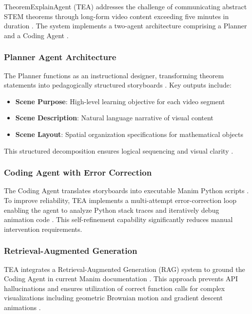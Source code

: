\documentclass[11pt,a4paper]{article}
\begin{document}
TheoremExplainAgent (TEA) addresses the challenge of communicating abstract STEM theorems through long-form video content exceeding five minutes in duration \cite{teaproject2024, researchgate2024tea}. The system implements a two-agent architecture comprising a Planner and a Coding Agent \cite{teaproject2024, researchgate2024tea}.

\subsubsection{Planner Agent Architecture}

The Planner functions as an instructional designer, transforming theorem statements into pedagogically structured storyboards \cite{arxivpdf2024tea}. Key outputs include:

\begin{itemize}
\item \textbf{Scene Purpose}: High-level learning objective for each video segment
\item \textbf{Scene Description}: Natural language narrative of visual content
\item \textbf{Scene Layout}: Spatial organization specifications for mathematical objects
\end{itemize}

This structured decomposition ensures logical sequencing and visual clarity \cite{arxiv2024visualstory}.

\subsubsection{Coding Agent with Error Correction}

The Coding Agent translates storyboards into executable Manim Python scripts \cite{teaproject2024, arxivpdf2024tea}. To improve reliability, TEA implements a multi-attempt error-correction loop enabling the agent to analyze Python stack traces and iteratively debug animation code \cite{arxivpdf2024tea}. This self-refinement capability significantly reduces manual intervention requirements.

\subsubsection{Retrieval-Augmented Generation}

TEA integrates a Retrieval-Augmented Generation (RAG) system to ground the Coding Agent in current Manim documentation \cite{github2024tea, arxivpdf2024tea}. This approach prevents API hallucinations and ensures utilization of correct function calls for complex visualizations including geometric Brownian motion and gradient descent animations \cite{teaproject2024, github2024tea, arxivpdf2024tea}.
\end{document}
